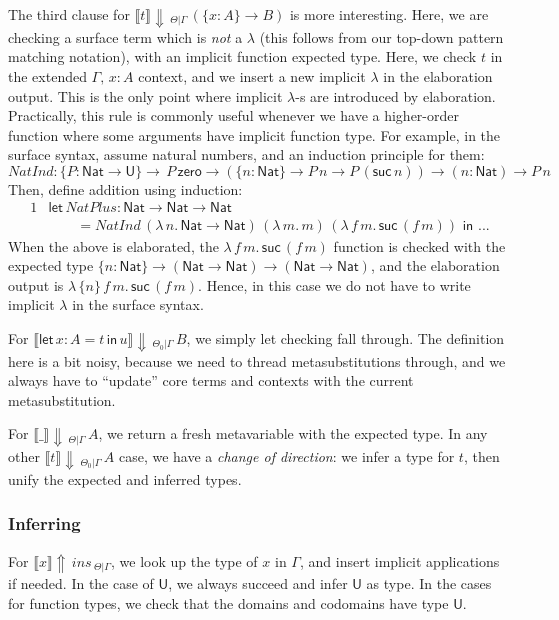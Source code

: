 \documentclass[acmsmall,review,anonymous,prologue,dvipsnames]{acmart}\settopmatter{printfolios=true,printccs=false,printacmref=false}
\newcommand{\slet}{\boldsymbol{\mathsf{let}}}
\renewcommand{\sin}{\boldsymbol{\mathsf{in}}}
\renewcommand{\U}{\mathsf{U}}
\newcommand{\echeck}[4]{\llbracket#1\rrbracket\!\Downarrow\,_{#2|#3}\,#4}
\newcommand{\einfer}[4]{\llbracket#1\rrbracket\!\Uparrow\,#2\,_{#3|#4}}
\newcommand{\Nat}{\mathsf{Nat}}
\newcommand{\zero}{\mathsf{zero}}
\newcommand{\suc}{\mathsf{suc}}
\theoremstyle{remark}
\begin{document}
The third clause for $\echeck{t}{\Theta}{\Gamma}{(\{x : A\}\to B)}$ is more
interesting. Here, we are checking a surface term which is \emph{not} a
$\lambda$ (this follows from our top-down pattern matching notation), with an
implicit function expected type. Here, we check $t$ in the extended $\Gamma,\,x
: A$ context, and we insert a new implicit $\lambda$ in the elaboration
output. This is the only point where implicit $\lambda$-s are introduced by
elaboration. Practically, this rule is commonly useful whenever we have a
higher-order function where some arguments have implicit function type. For
example, in the surface syntax, assume natural numbers, and an induction
principle for them:
\[
NatInd : \{P : \Nat \to \U\}\to \,P\,\zero \to (\{n : \Nat\}\to P\,n \to
         P\,(\suc\,n)) \to (n : \Nat) \to P\,n
\]
Then, define addition using induction:
\begin{alignat*}{1}
& \slet\, NatPlus : \Nat \to \Nat \to \Nat\\
& \qquad = NatInd\,(\lambda\,n.\,\Nat\to\Nat)\,(\lambda\,m.\,m)\,
                        (\lambda\,f\,m.\,\suc\,(f\,m))\,\,\sin\,\,...
\end{alignat*}
When the above is elaborated, the $\lambda\,f\,m.\,\suc\,(f\,m)$ function is
checked with the expected type $\{n : \Nat\}\to (\Nat \to \Nat) \to (\Nat \to
\Nat)$, and the elaboration output is $\lambda\,\{n\}\,f\,m.\,\suc\,(f\,m)$.
Hence, in this case we do not have to write implicit $\lambda$ in the surface
syntax.

For $\echeck{\slet\,x:A=t\,\sin\,u}{\Theta_0}{\Gamma}{B}$, we simply let
checking fall through. The definition here is a bit noisy, because we need to
thread metasubstitutions through, and we always have to ``update'' core terms
and contexts with the current metasubstitution.

For $\echeck{\_}{\Theta}{\Gamma}{A}$, we return a fresh metavariable with the
expected type. In any other $\echeck{t}{\Theta_0}{\Gamma}{A}$ case, we have a
\emph{change of direction}: we infer a type for $t$, then unify the expected and
inferred types.

\subsubsection{Inferring}

For $\einfer{x}{ins}{\Theta}{\Gamma}$, we look up the type of $x$ in $\Gamma$,
and insert implicit applications if needed. In the case of $\U$, we always
succeed and infer $\U$ as type. In the cases for function types, we check that
the domains and codomains have type $\U$.
\end{document}
